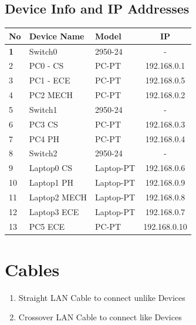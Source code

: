 \documentclass[11pt]{article}
\begin{document}
\subsection{Device Info and IP Addresses}
\begin{table}[H]
	\begin{tabular}{|l|l|l|c|}
		\hline
		\textbf{No} & \textbf{Device Name} & \textbf{Model} & \textbf{IP}       \\ \hline
		\textbf{1}  & Switch0              & 2950-24        & - \\ \hline
		2           & PC0 - CS             & PC-PT          & 192.168.0.1 \\ \hline
		3           & PC1 - ECE            & PC-PT          & 192.168.0.5 \\ \hline
		4           & PC2 MECH             & PC-PT          & 192.168.0.2 \\ \hline
		5           & Switch1              & 2950-24        & - \\ \hline
		6           & PC3 CS               & PC-PT          & 192.168.0.3 \\ \hline
		7           & PC4 PH               & PC-PT          & 192.168.0.4 \\ \hline
		8           & Switch2              & 2950-24        & - \\ \hline
		9           & Laptop0 CS           & Laptop-PT      & 192.168.0.6 \\ \hline
		10          & Laptop1 PH           & Laptop-PT      & 192.168.0.9 \\ \hline
		11          & Laptop2 MECH         & Laptop-PT      & 192.168.0.8 \\ \hline
		12          & Laptop3 ECE          & Laptop-PT      & 192.168.0.7 \\ \hline
		13          & PC5 ECE              & PC-PT          & 192.168.0.10 \\ \hline
	\end{tabular}
\end{table}


\section{Cables}
\begin{enumerate}
	\item Straight LAN Cable to connect unlike Devices
	\item Crossover LAN Cable to connect like Devices
\end{enumerate}
\end{document}
